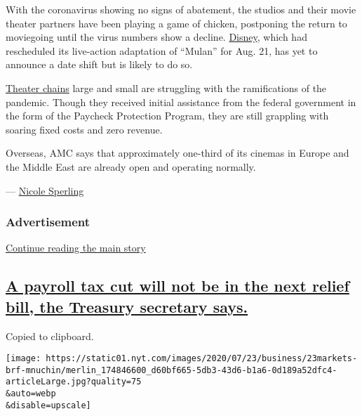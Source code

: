 With the coronavirus showing no signs of abatement, the studios and
their movie theater partners have been playing a game of chicken,
postponing the return to moviegoing until the virus numbers show a
decline.
\href{https://www.nytimes.com/2020/07/13/business/hong-kong-disneyland-closing.html}{Disney},
which had rescheduled its live-action adaptation of ``Mulan'' for Aug.
21, has yet to announce a date shift but is likely to do so.

\href{https://www.nytimes.com/live/2020/07/07/business/stock-market-today-coronavirus\#several-movie-theater-chains-sue-new-jersey-over-its-reopening-plan}{Theater
chains} large and small are struggling with the ramifications of the
pandemic. Though they received initial assistance from the federal
government in the form of the Paycheck Protection Program, they are
still grappling with soaring fixed costs and zero revenue.

Overseas, AMC says that approximately one-third of its cinemas in Europe
and the Middle East are already open and operating normally.

--- \href{https://www.nytimes.com/by/nicole-sperling}{Nicole Sperling}

\hypertarget{advertisement-1}{%
\subsubsection{Advertisement}\label{advertisement-1}}

\protect\hyperlink{after-dfp-ad-mid2}{Continue reading the main story}

\hypertarget{a-payroll-tax-cut-will-not-be-in-the-next-relief-bill-the-treasury-secretary-says}{%
\subsection{\texorpdfstring{\protect\hyperlink{a-payroll-tax-cut-will-not-be-in-the-next-relief-bill-the-treasury-secretary-says}{A
payroll tax cut will not be in the next relief bill, the Treasury
secretary
says.}}{A payroll tax cut will not be in the next relief bill, the Treasury secretary says.}}\label{a-payroll-tax-cut-will-not-be-in-the-next-relief-bill-the-treasury-secretary-says}}

Copied to clipboard.

\texttt{[image: https://static01.nyt.com/images/2020/07/23/business/23markets-brf-mnuchin/merlin\_174846600\_d60bf665-5db3-43d6-b1a6-0d189a52dfc4-articleLarge.jpg?quality=75\\\&auto=webp\\\&disable=upscale]}

